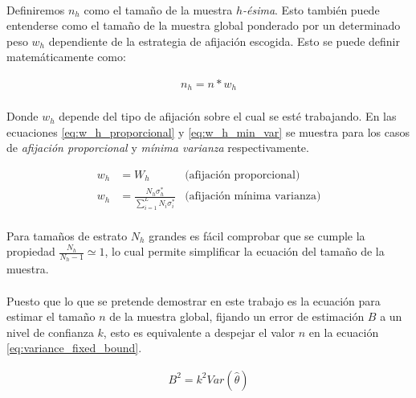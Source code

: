 \documentclass{article}
\begin{document}
    \paragraph{}
    Definiremos $n_h$ como el tamaño de la muestra \emph{$h$-ésima}. Esto también puede entenderse como el tamaño de la muestra global ponderado por un determinado peso $w_h$  dependiente de la estrategia de afijación escogida. Esto se puede definir matemáticamente como:

    \begin{align}
      n_h = n * w_h
    \end{align}

    \paragraph{}
    Donde $w_h$ depende del tipo de afijación sobre el cual se esté trabajando. En las ecuaciones \eqref{eq:w_h_proporcional} y \eqref{eq:w_h_min_var} se muestra para los casos de \emph{afijación proporcional} y \emph{mínima varianza} respectivamente.

    \begin{align}
    \label{eq:w_h_proporcional}
      w_h &= W_h &\text{(afijación proporcional)}\\
    \label{eq:w_h_min_var}
      w_h &= \frac{N_h\sigma_h^*}{\sum\limits_{i=1}^LN_i\sigma_i^*}&\text{(afijación mínima varianza)}
    \end{align}

    \paragraph{}
    Para tamaños de estrato $N_h$ grandes es fácil comprobar que se cumple la propiedad $\frac{N_h}{N_h -1} \simeq 1$, lo cual permite simplificar la ecuación del tamaño de la muestra.

    \paragraph{}
    Puesto que lo que se pretende demostrar en este trabajo es la ecuación para estimar el tamaño $n$ de la muestra global, fijando un error de estimación $B$ a un nivel de confianza $k$, esto es equivalente a despejar el valor $n$ en la ecuación \eqref{eq:variance_fixed_bound}.

    \begin{align}
    \label{eq:variance_fixed_bound}
      B^2 = k^2Var(\widehat{\theta})
    \end{align}
\end{document}
